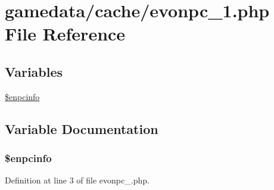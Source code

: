 \hypertarget{evonpc__1_8php}{\section{gamedata/cache/evonpc\+\_\+1.php File Reference}
\label{evonpc__1_8php}
}
\subsection*{Variables}
\begin{DoxyCompactItemize}
\item 
\hyperlink{evonpc__1_8php_aff455f264010423a0f96223d84a03b00}{\$enpcinfo}
\end{DoxyCompactItemize}


\subsection{Variable Documentation}
\hypertarget{evonpc__1_8php_aff455f264010423a0f96223d84a03b00}{
\subsubsection[{\$enpcinfo}]{\setlength{\rightskip}{0pt plus 5cm}\$enpcinfo}}\label{evonpc__1_8php_aff455f264010423a0f96223d84a03b00}


Definition at line 3 of file evonpc\+\_.\+php.

